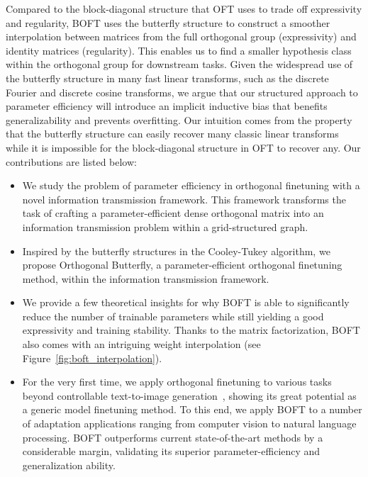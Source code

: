 \vspace{-0.6mm}

Compared to the block-diagonal structure that OFT uses to trade off expressivity and regularity, BOFT uses the butterfly structure to construct a smoother interpolation between matrices from the full orthogonal group (expressivity) and identity matrices (regularity). This enables us to find a smaller hypothesis class within the orthogonal group for downstream tasks. 
Given the widespread use of the butterfly structure in many fast linear transforms, such as the discrete Fourier and discrete cosine transforms, we argue that our structured approach to parameter efficiency will introduce an implicit inductive bias that benefits generalizability and prevents overfitting. Our intuition comes from the property that the butterfly structure can easily recover many classic linear transforms while it is impossible for the block-diagonal structure in OFT to recover any. Our contributions are listed below:

\vspace{-0.6mm}

\begin{itemize}[leftmargin=*,nosep]
\setlength\itemsep{0.39em}
    \item We study the problem of parameter efficiency in orthogonal finetuning with a novel information transmission framework. This framework transforms the task of crafting a parameter-efficient dense orthogonal matrix into an information transmission problem within a grid-structured graph.
    \item Inspired by the butterfly structures in the Cooley-Tukey algorithm, we propose Orthogonal Butterfly, a parameter-efficient orthogonal finetuning method, within the information transmission framework.
    \item We provide a few theoretical insights for why BOFT is able to significantly reduce the number of trainable parameters while still yielding a good expressivity and training stability. Thanks to the matrix factorization, BOFT also comes with an intriguing weight interpolation (see Figure~\ref{fig:boft_interpolation}).
    \item For the very first time, we apply orthogonal finetuning to various tasks beyond controllable text-to-image generation~\cite{qiu2023controlling}, showing its great potential as a generic model finetuning method. To this end, we apply BOFT to a number of adaptation applications ranging from computer vision to natural language processing. BOFT outperforms current state-of-the-art methods by a considerable margin, validating its superior parameter-efficiency and generalization ability.
\end{itemize}

